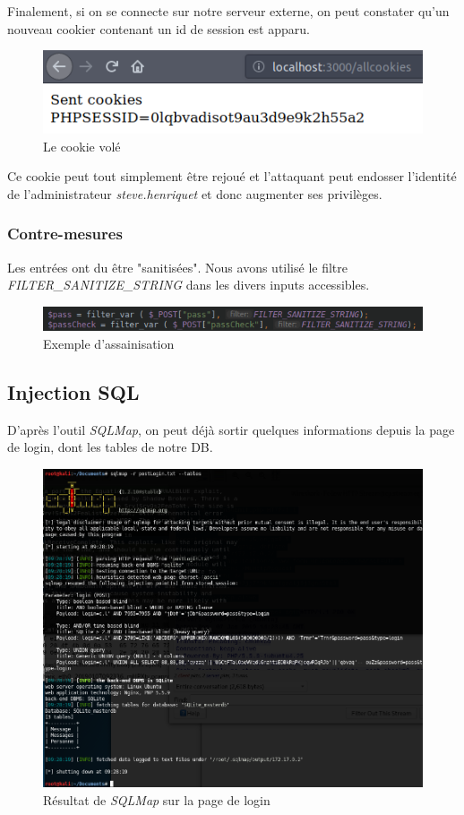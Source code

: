 \documentclass[12pt]{article}
\begin{document}
Finalement, si on se connecte sur notre serveur externe, on peut constater qu'un nouveau cookier contenant un id de session est apparu.

\begin{figure}[H]
\centering
\includegraphics[width=\linewidth]{images/cookieStolen.png}
\caption{Le cookie volé}
\end{figure}

Ce cookie peut tout simplement être rejoué et l'attaquant peut endosser l'identité de l'administrateur \textit{steve.henriquet} et donc augmenter ses privilèges.


\subsubsection{Contre-mesures}
Les entrées ont du être "sanitisées". Nous avons utilisé le filtre \textit{FILTER\_SANITIZE\_STRING} dans les divers inputs accessibles.
\begin{figure}[H]
\centering
\includegraphics[width=\linewidth]{images/sanitize.png}
\caption{Exemple d'assainisation}
\end{figure}

\subsection{Injection SQL}
D'après l'outil \textit{SQLMap}, on peut déjà sortir quelques informations depuis la page de login, dont les tables de notre DB. 

\begin{figure}[H]
\centering
\includegraphics[width=\linewidth]{images/sqli.png}
\caption{Résultat de \textit{SQLMap} sur la page de login}
\end{figure}
\end{document}
